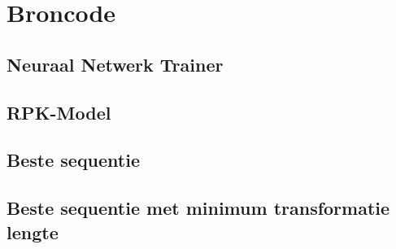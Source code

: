 \chapter{Broncode}
\label{app:broncode}

\section{Neuraal Netwerk Trainer}
\label{Broncode:ANN}


\section{RPK-Model}
\label{Broncode:RPK}


\section{Beste sequentie}
\label{Broncode:algo1}


\section{Beste sequentie met minimum transformatie lengte}
\label{Broncode:algo2}


